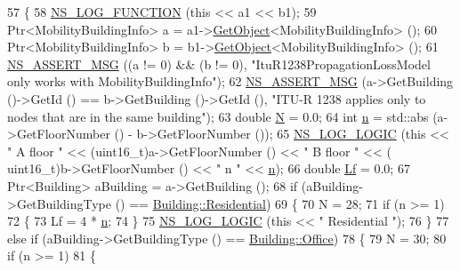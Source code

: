 \begin{DoxyCode}
57 \{
58   \hyperlink{log-macros-disabled_8h_a90b90d5bad1f39cb1b64923ea94c0761}{NS\_LOG\_FUNCTION} (\textcolor{keyword}{this} << a1 << b1);
59   Ptr<MobilityBuildingInfo> a = a1->\hyperlink{classns3_1_1Object_a13e18c00017096c8381eb651d5bd0783}{GetObject}<MobilityBuildingInfo> ();
60   Ptr<MobilityBuildingInfo> b = b1->\hyperlink{classns3_1_1Object_a13e18c00017096c8381eb651d5bd0783}{GetObject}<MobilityBuildingInfo> ();
61   \hyperlink{assert_8h_aff5ece9066c74e681e74999856f08539}{NS\_ASSERT\_MSG} ((a != 0) && (b != 0), \textcolor{stringliteral}{"ItuR1238PropagationLossModel only works with
       MobilityBuildingInfo"});
62   \hyperlink{assert_8h_aff5ece9066c74e681e74999856f08539}{NS\_ASSERT\_MSG} (a->GetBuilding ()->GetId () == b->GetBuilding ()->GetId (), \textcolor{stringliteral}{"ITU-R 1238
       applies only to nodes that are in the same building"});
63   \textcolor{keywordtype}{double} \hyperlink{loss__ITU1238_8m_aaa6c78b1d659f53598dbe891c1139b3e}{N} = 0.0;
64   \textcolor{keywordtype}{int} \hyperlink{namespacesample-rng-plot_aeb5ee5c431e338ef39b7ac5431242e1d}{n} = std::abs (a->GetFloorNumber () - b->GetFloorNumber ());
65   \hyperlink{group__logging_ga88acd260151caf2db9c0fc84997f45ce}{NS\_LOG\_LOGIC} (\textcolor{keyword}{this} << \textcolor{stringliteral}{" A floor "} << (uint16\_t)a->GetFloorNumber () << \textcolor{stringliteral}{" B floor "} << (
      uint16\_t)b->GetFloorNumber () << \textcolor{stringliteral}{" n "} << \hyperlink{namespacesample-rng-plot_aeb5ee5c431e338ef39b7ac5431242e1d}{n});
66   \textcolor{keywordtype}{double} \hyperlink{loss__ITU1238_8m_a8fcbff4c17ae7ed51590a7aa751a8f93}{Lf} = 0.0;
67   Ptr<Building> aBuilding = a->GetBuilding ();
68   \textcolor{keywordflow}{if} (aBuilding->GetBuildingType () == \hyperlink{classns3_1_1Building_af7f3940d00690b70af02310575d94ef3a5af50bb22db7202f426f0e7621bafc7b}{Building::Residential})
69     \{
70       N = 28;
71       \textcolor{keywordflow}{if} (n >= 1)
72         \{
73           Lf = 4 * \hyperlink{namespacesample-rng-plot_aeb5ee5c431e338ef39b7ac5431242e1d}{n};
74         \}
75       \hyperlink{group__logging_ga88acd260151caf2db9c0fc84997f45ce}{NS\_LOG\_LOGIC} (\textcolor{keyword}{this} << \textcolor{stringliteral}{" Residential "});
76     \}
77   \textcolor{keywordflow}{else} \textcolor{keywordflow}{if} (aBuilding->GetBuildingType () == \hyperlink{classns3_1_1Building_af7f3940d00690b70af02310575d94ef3acbb89a32dbb85f1eb6ac70baf61a0735}{Building::Office})
78     \{
79       N = 30;
80       \textcolor{keywordflow}{if} (n >= 1)
81         \{

\end{DoxyCode}
